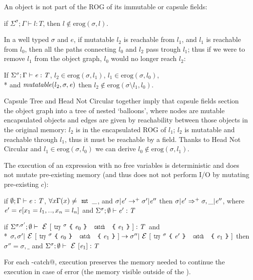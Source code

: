 \noindent An object is not part of the ROG of its immutable or capsule fields:\saveSpace\saveSpace
\begin{Assumption}
if
$\Sigma^\sigma;\Gamma\vdash l:T$,
then $l\notin\text{erog}(\sigma,l)$.
\end{Assumption}


\noindent In a well typed $\sigma$ and $e$, if mutatable $l_2$ is reachable from
$l_1$, and $l_1$ is reachable from $l_0$,
then all the paths connecting $l_0$ and $l_2$ pass trough $l_1$; thus
if we were to remove $l_1$ from the object graph, $l_0$ would no longer reach $l_2$:
\saveSpace\saveSpace
\begin{Assumption}
If   $\Sigma^\sigma;\Gamma\vdash \e:\T$,
$l_2\in\text{erog}(\sigma,l_1)$,
$l_1\in\text{erog}(\sigma,l_0)$,\\*
and
$\mathit{mutatable}(l_2,\sigma,\e)$
then 
$l_2\notin\text{erog}(\sigma\setminus l_1,l_0)$.
\end{Assumption}


Capsule Tree and Head Not Circular together 
imply that capsule fields section the object graph into a tree of nested `balloons',
where nodes are mutable encapsulated objects and
edges are given by reachability between those objects in the original memory:
$l_2$ is in the encapsulated ROG of $l_1$;
$l_2$ is mutatable and reachable through $l_1$, thus
it must be reachable by a \Q@capsule@ field.
Thanks to Head Not Circular and $l_1\in\text{erog}(\sigma,l_0)$ we can derive 
$l_0\notin\text{erog}(\sigma,l_1)$.

The execution of an expression
with no \Q@mut@ free variables is deterministic and does not
mutate pre-existing memory (and thus does not not perform I/O by mutating pre-existing $c$):
\begin{Assumption}[Determinism]
if $\emptyset;\Gamma\vdash \e:\T$, 
$\forall x \Gamma(x)\neq\Kw{mut}\,\_$, and
$\sigma | \e'\rightarrow^+ \sigma' | \e''$
then 
$\sigma | \e'\Rightarrow^+ \sigma,\_ | \e''$,
where $\e'=\e[x_1=l_1,\ldots,x_n=l_n]$ and $\Sigma^\sigma;\emptyset\vdash \e':\T$
\end{Assumption}

\begin{Assumption}[StrongExceptionSafety]
if $\Sigma^{\sigma,\sigma'};\emptyset\vdash \ctx[\Kw{try}^\sigma\oC\e_0\cC\ \Kw{catch}\ \oC\e_1\cC]:\T$
and\\*
$
\sigma,\sigma'|\ctx[\Kw{try}^\sigma\oC\e_0\cC\ \Kw{catch}\ \oC\e_1\cC]\rightarrow 
\sigma''|\ctx[\Kw{try}^\sigma\oC\e'\cC\ \Kw{catch}\ \oC\e_1\cC]
$
then 
$\sigma''=\sigma,\_$
and
$\Sigma^\sigma;\emptyset\vdash \ctx[\e_1]:\T$
\end{Assumption}
\noindent
For each \Q@try-catch@, execution preserves the memory needed to continue the execution in case of error
(the memory visible outside of the \Q@try@).%

